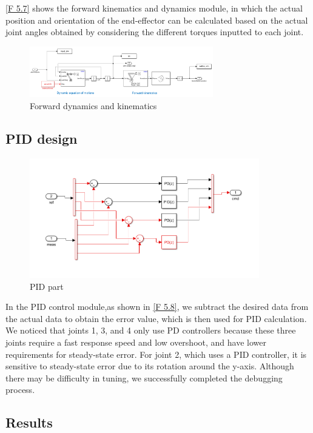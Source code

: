 \autoref{F 5.7} shows the forward kinematics and dynamics module, in which the actual position and orientation of the end-effector can be calculated based on the actual joint angles obtained by considering the different torques inputted to each joint.

\begin{figure}[htbp]
	\centering
	\includegraphics[width=8cm]{./fig/FDK.png}
	\caption{Forward dynamics and kinematics}
	\label{F 5.7}
\end{figure}


\subsection{PID design}



\begin{figure}[htbp]
	\centering
	\includegraphics[width=10cm]{./fig/PID.png}
	\caption{PID part}
	\label{F 5.8}
\end{figure}

In the PID control module,as shown in \autoref{F 5.8}, we subtract the desired data from the actual data to obtain the error value, which is then used for PID calculation. We noticed that joints 1, 3, and 4 only use PD controllers because these three joints require a fast response speed and low overshoot, and have lower requirements for steady-state error. For joint 2, which uses a PID controller, it is sensitive to steady-state error due to its rotation around the y-axis. Although there may be difficulty in tuning, we successfully completed the debugging process.


\subsection{Results}

